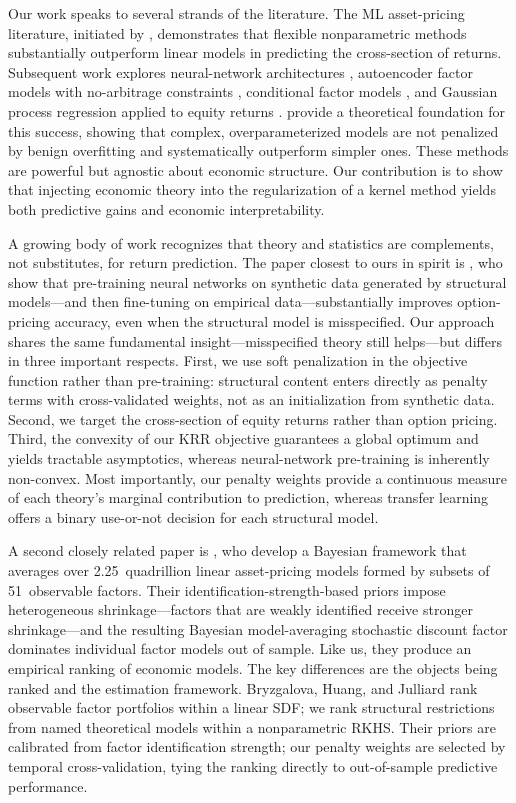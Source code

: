 Our work speaks to several strands of the literature. The ML asset-pricing literature, initiated by \citet{gu2020empirical}, demonstrates that flexible nonparametric methods substantially outperform linear models in predicting the cross-section of returns. Subsequent work explores neural-network architectures \citep{chen2024deep}, autoencoder factor models with no-arbitrage constraints \citep{Gu2021autoencoder}, conditional factor models \citep{kelly2019characteristics}, and Gaussian process regression applied to equity returns \citep{Filipovic2022gaussian}. \citet{Kelly2024virtue} provide a theoretical foundation for this success, showing that complex, overparameterized models are not penalized by benign overfitting and systematically outperform simpler ones. These methods are powerful but agnostic about economic structure. Our contribution is to show that injecting economic theory into the regularization of a kernel method yields both predictive gains and economic interpretability.

A growing body of work recognizes that theory and statistics are complements, not substitutes, for return prediction. The paper closest to ours in spirit is \citet{Chen2026teaching}, who show that pre-training neural networks on synthetic data generated by structural models---and then fine-tuning on empirical data---substantially improves option-pricing accuracy, even when the structural model is misspecified. Our approach shares the same fundamental insight---misspecified theory still helps---but differs in three important respects. First, we use soft penalization in the objective function rather than pre-training: structural content enters directly as penalty terms with cross-validated weights, not as an initialization from synthetic data. Second, we target the cross-section of equity returns rather than option pricing. Third, the convexity of our KRR objective guarantees a global optimum and yields tractable asymptotics, whereas neural-network pre-training is inherently non-convex. Most importantly, our penalty weights provide a continuous measure of each theory's marginal contribution to prediction, whereas transfer learning offers a binary use-or-not decision for each structural model.

A second closely related paper is \citet{Bryzgalova2023bayesian}, who develop a Bayesian framework that averages over 2.25~quadrillion linear asset-pricing models formed by subsets of 51~observable factors. Their identification-strength-based priors impose heterogeneous shrinkage---factors that are weakly identified receive stronger shrinkage---and the resulting Bayesian model-averaging stochastic discount factor dominates individual factor models out of sample. Like us, they produce an empirical ranking of economic models. The key differences are the objects being ranked and the estimation framework. Bryzgalova, Huang, and Julliard rank observable factor portfolios within a linear SDF; we rank structural restrictions from named theoretical models within a nonparametric RKHS. Their priors are calibrated from factor identification strength; our penalty weights are selected by temporal cross-validation, tying the ranking directly to out-of-sample predictive performance.

